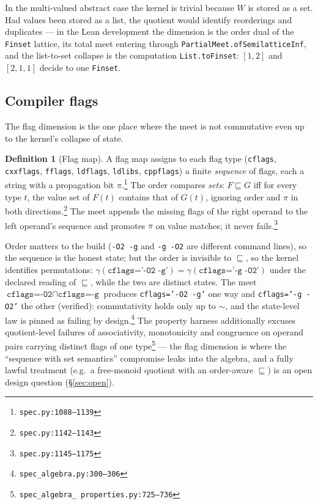 \documentclass[11pt]{article}
\theoremstyle{definition}
\newtheorem{definition}[theorem]{Definition}
\theoremstyle{remark}
\newcommand{\sat}{\sqsubseteq}
\renewcommand{\ker}{\sim}
\newcommand{\meet}{\sqcap}
\newcommand{\den}[1]{\gamma(#1)}
\newcommand{\code}[1]{\texttt{#1}}
\newcommand{\src}[1]{\footnote{\code{#1}}}
\begin{document}
In the multi-valued abstract case the kernel is trivial because $W$ is stored
as a set.  Had values been stored as a list, the quotient would identify
reorderings and duplicates --- in the Lean development the dimension is the
order dual of the \code{Finset} lattice, its total meet entering through
\code{PartialMeet.ofSemilatticeInf}, and the list-to-set collapse is the
computation \code{List.toFinset}: $[1,2]$ and $[2,1,1]$ decide to one
\code{Finset}.

\subsection{Compiler flags}\label{sec:flags}

The flag dimension is the one place where the meet is not commutative even up
to the kernel's collapse of state.

\begin{definition}[Flag map]
A flag map assigns to each flag type (\code{cflags}, \code{cxxflags},
\code{fflags}, \code{ldflags}, \code{ldlibs}, \code{cppflags}) a finite
\emph{sequence} of flags, each a string with a propagation bit
$\pi$.\src{spec.py:1088--1139}  The order compares \emph{sets}: $F \sat G$
iff for every type $t$, the value set of $F(t)$ contains that of $G(t)$,
ignoring order and $\pi$ in both directions.\src{spec.py:1142--1143}  The meet
appends the missing flags of the right operand to the left operand's sequence
and promotes $\pi$ on value matches; it never fails.\src{spec.py:1145--1175}
\end{definition}

Order matters to the build (\code{-O2 -g} and \code{-g -O2} are different
command lines), so the sequence is the honest state; but the order is
invisible to $\sat$, so the kernel identifies permutations:
$\den{\code{cflags='-O2 -g'}} = \den{\code{cflags='-g -O2'}}$ under the
declared reading of $\sat$, while the two are distinct states.  The meet
$\code{cflags=-O2} \meet \code{cflags=-g}$ produces \code{cflags='-O2 -g'} one
way and \code{cflags='-g -O2'} the other (verified): commutativity holds only
up to $\ker$, and the state-level law is pinned as failing by
design.\src{spec\_algebra.py:300--306}  The property harness additionally
excuses quotient-level failures of associativity, monotonicity and congruence
on operand pairs carrying distinct flags of one type\src{spec\_algebra\_%
properties.py:725--736} --- the flag dimension is where the ``sequence with
set semantics'' compromise leaks into the algebra, and a fully lawful
treatment (e.g.\ a free-monoid quotient with an order-aware $\sat$) is an
open design question (\S\ref{sec:open}).
\end{document}

